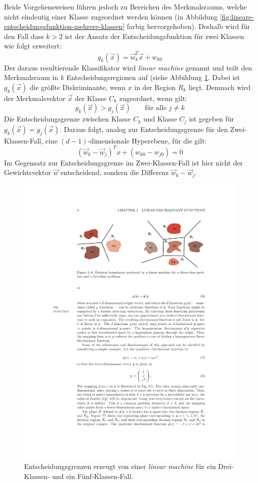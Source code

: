 Beide Vorgehensweisen führen jedoch zu Bereichen des Merkmalsraums, welche nicht eindeutig einer Klasse zugeordnet werden können (in Abbildung \ref{fig:lineare-entscheidungsfunktion-mehrere-klassen} farbig hervorgehoben).
Deshalb wird für den Fall dass $k > 2$ ist der Ansatz der Entscheidungsfunktion für zwei Klassen wie folgt erweitert:
\[
	g_k(\vec{x}) = \vec{w}_k^T\vec{x} + w_{k0}
\]
Der daraus resultierende Klassifikator wird \emph{linear machine} genannt und teilt den Merkmalsraum in $k$ Entscheidungsregionen auf (siehe Abbildung \ref{fig:linear-machine}. Dabei ist $g_k(\vec{x})$ die größte Diskriminante, wenn $x$ in der Region $R_k$ liegt. Demnach wird der Merkmalsvektor $\vec{x}$ der Klasse $C_k$ zugeordnet, wenn gilt:
\[
	g_k(\vec{x}) > g_j(\vec{x}) \qquad \text{für alle } j \ne k
\]
Die Entscheidungsgrenze zwischen Klasse $C_k$ und Klasse $C_j$ ist gegeben für $g_k(\vec{x}) = g_j(\vec{x})$. Daraus folgt, analog zur Entscheidungsgrenze für den Zwei-Klassen-Fall, eine $(d-1)$-dimensionale Hyperebene, für die gilt:
\[
	(\vec{w}_k - \vec{w}_j)^T x + (w_{k0} - w_{j0}) = 0
\]
Im Gegensatz zur Entscheidungsgrenze im Zwei-Klassen-Fall ist hier nicht der Gewichtsvektor $\vec{w}$ entscheidend, sondern die Differenz $\vec{w}_k - \vec{w}_j$.

\begin{figure}[ht!] \centering 
	\includegraphics[width=\linewidth]{figures/ch02_linear-machine.pdf}
	\caption{Entscheidungsgrenzen erzeugt von einer \emph{linear machine} für ein Drei-Klassen- und ein Fünf-Klassen-Fall.}
	\label{fig:linear-machine}
\end{figure}

